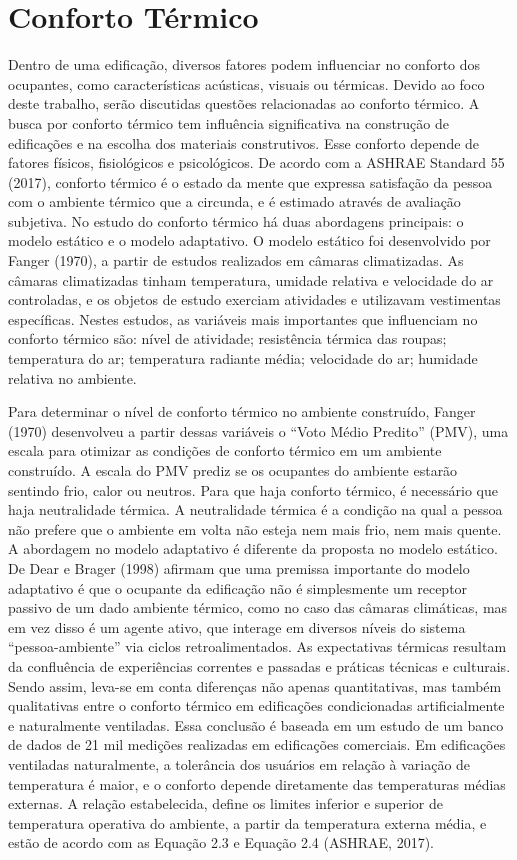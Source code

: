 \documentclass[brazil,hardcopy,openany,a5paper]{ufscthesis}
\begin{document}
	\section{Conforto Térmico}
	
	Dentro de uma edificação, diversos fatores podem influenciar no conforto dos ocupantes, como características acústicas, visuais ou térmicas. Devido ao foco deste trabalho, serão discutidas questões relacionadas ao conforto térmico.
	A busca por conforto térmico tem influência significativa na construção de edificações e na escolha dos materiais construtivos. Esse conforto depende de fatores físicos, fisiológicos e psicológicos. De acordo com a ASHRAE Standard 55 (2017), conforto térmico é o estado da mente que expressa satisfação da pessoa com o ambiente térmico que a circunda, e é estimado através de avaliação subjetiva. No estudo do conforto térmico há duas abordagens principais: o modelo estático e o modelo adaptativo.
	O modelo estático foi desenvolvido por Fanger (1970), a partir de estudos realizados em câmaras climatizadas. As câmaras climatizadas tinham temperatura, umidade relativa e velocidade do ar controladas, e os objetos de estudo exerciam atividades e utilizavam vestimentas específicas. Nestes estudos, as variáveis mais importantes que influenciam no conforto térmico são: nível de atividade; resistência térmica das roupas; temperatura do ar; temperatura radiante média; velocidade do ar; humidade relativa no ambiente.

	Para determinar o nível de conforto térmico no ambiente construído, Fanger (1970) desenvolveu a partir dessas variáveis o “Voto Médio Predito” (PMV), uma escala para otimizar as condições de conforto térmico em um ambiente construído. A escala do PMV prediz se os ocupantes do ambiente estarão sentindo frio, calor ou neutros. Para que haja conforto térmico, é necessário que haja neutralidade térmica. A neutralidade térmica é a condição na qual a pessoa não prefere que o ambiente em volta não esteja nem mais frio, nem mais quente.
	A abordagem no modelo adaptativo é diferente da proposta no modelo estático. De Dear e Brager (1998) afirmam que uma premissa importante do modelo adaptativo é que o ocupante da edificação não é simplesmente um receptor passivo de um dado ambiente térmico, como no caso das câmaras climáticas, mas em vez disso é um agente ativo, que interage em diversos níveis do sistema “pessoa-ambiente” via ciclos retroalimentados. As expectativas térmicas resultam da confluência de experiências correntes e passadas e práticas técnicas e culturais. Sendo assim, leva-se em conta diferenças não apenas quantitativas, mas também qualitativas entre o conforto térmico em edificações condicionadas artificialmente e naturalmente ventiladas. Essa conclusão é baseada em um estudo de um banco de dados de 21 mil medições realizadas em edificações comerciais. Em edificações ventiladas naturalmente, a tolerância dos usuários em relação à variação de temperatura é maior, e o conforto depende diretamente das temperaturas médias externas.
	A relação estabelecida, define os limites inferior e superior de temperatura operativa do ambiente, a partir da temperatura externa média, e estão de acordo com as Equação 2.3 e Equação 2.4 (ASHRAE, 2017).
	
\end{document}

